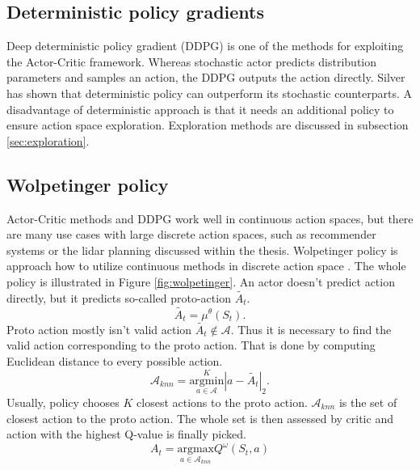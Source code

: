 \subsection{Deterministic policy gradients}
Deep deterministic policy gradient (DDPG) is one of the methods for exploiting the Actor-Critic framework. Whereas stochastic actor predicts distribution parameters and samples an action, the DDPG outputs the action directly. Silver \cite{silver2014} has shown that deterministic policy can outperform its stochastic counterparts. A disadvantage of deterministic approach is that it needs an additional policy to ensure action space exploration. Exploration methods are discussed in subsection \ref{sec:exploration}.

\subsection{Wolpetinger policy}
Actor-Critic methods and DDPG work well in continuous action spaces, but there are many use cases with large discrete action spaces, such as recommender systems or the lidar planning discussed within the thesis. Wolpetinger policy is approach how to utilize continuous methods in discrete action space \cite{dulac2015}. The whole policy is illustrated in Figure \ref{fig:wolpetinger}. An actor doesn't predict action directly, but it predicts so-called proto-action $\tilde{A_t}$.
\begin{equation}
\tilde{A_t} = \mu^\theta(S_t).
\end{equation}
Proto action mostly isn't valid action $\tilde{A_t} \notin \mathcal{A}$. Thus it is necessary to find the valid action corresponding to the proto action. That is done by computing Euclidean distance to every possible action.
\begin{equation} \label{eq:knn}
\mathcal{A}_{knn} = \overset{K}{\underset{a \in \mathcal{A}}{{\text{argmin}}}} | a - \tilde{A_t} |_2 .
\end{equation}
Usually, policy chooses $K$ closest actions to the proto action. $\mathcal{A}_{knn}$ is the set of closest action to the proto action. The whole set is then assessed by critic and action with the highest Q-value is finally picked.
\begin{equation}
A_t = \underset{a \in \mathcal{A}_{knn}}{\text{argmax}} Q^\omega(S_t, a)
\end{equation}
